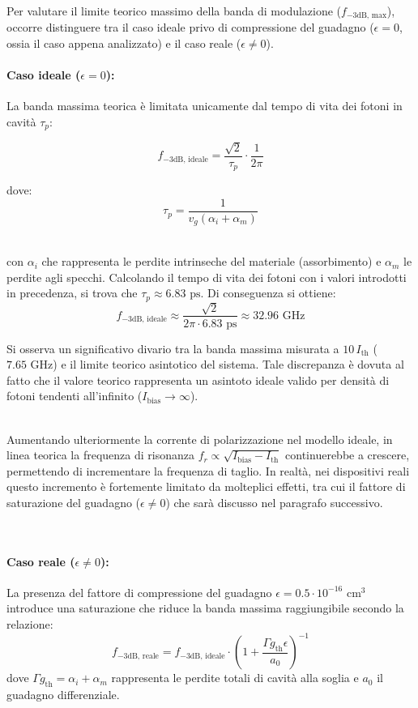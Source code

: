 \noindent\\ Per valutare il limite teorico massimo della banda di modulazione ($f_{-3\text{dB, max}}$), occorre distinguere tra il caso ideale privo di compressione del
guadagno ($\epsilon = 0$, ossia il caso appena analizzato) e il caso reale ($\epsilon \neq 0$).

\paragraph{Caso ideale ($\epsilon = 0$):} 
La banda massima teorica è limitata unicamente dal tempo di vita dei fotoni in cavità $\tau_p$:

\begin{equation}
f_{-3\text{dB, ideale}} = \frac{\sqrt{2}}{\tau_p} \cdot \frac{1}{2\pi}
\end{equation}

\noindent dove:
\[ 
\tau_p = \frac{1}{v_g (\alpha_i + \alpha_m)}
\]

\noindent\\ con $\alpha_i$ che rappresenta le perdite intrinseche del materiale (assorbimento) e $\alpha_m$ le perdite agli specchi. Calcolando il tempo di vita dei fotoni 
con i valori introdotti in precedenza, si trova che $\tau_p \approx 6.83\text{ ps}$. Di conseguenza si ottiene:
\begin{equation}
f_{-3\text{dB, ideale}} \approx \frac{\sqrt{2}}{2\pi \cdot 6.83\text{ ps}} \approx 32.96\text{ GHz}
\end{equation}

\noindent Si osserva un significativo divario tra la banda massima misurata a $10 \, I_{\text{th}}$ ($7.65\text{ GHz}$) e il limite teorico asintotico del sistema.
Tale discrepanza è dovuta al fatto che il valore teorico rappresenta un asintoto ideale valido per densità di fotoni tendenti all'infinito ($I_{\text{bias}} \to \infty$). 

\noindent\\ Aumentando ulteriormente la corrente di polarizzazione nel modello ideale, in linea teorica la frequenza di risonanza
$f_r \propto \sqrt{I_{\text{bias}} - I_{\text{th}}}$ continuerebbe a crescere, permettendo di incrementare la frequenza di taglio. In realtà, nei dispositivi reali questo
incremento è fortemente limitato da molteplici effetti, tra cui il fattore di saturazione del guadagno ($\epsilon \neq 0$) che sarà discusso nel paragrafo successivo.

\noindent\\
\paragraph{Caso reale ($\epsilon \neq 0$):} 
La presenza del fattore di compressione del guadagno $\epsilon = 0.5 \cdot 10^{-16} \text{ cm}^3$ introduce una saturazione che riduce la banda massima raggiungibile secondo la relazione:
\begin{equation}
f_{-3\text{dB, reale}} = f_{-3\text{dB, ideale}} \cdot \left(1 + \frac{\Gamma g_{\text{th}} \epsilon}{a_0}\right)^{-1}
\end{equation}
dove $\Gamma g_{\text{th}} = \alpha_i + \alpha_m$ rappresenta le perdite totali di cavità alla soglia e $a_0$ il guadagno differenziale.

